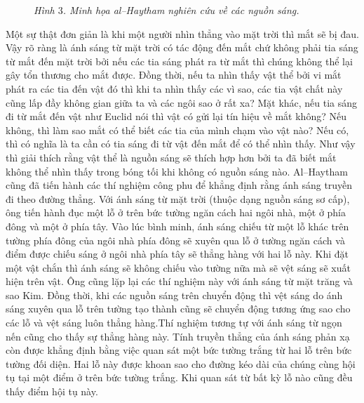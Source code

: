 \begin{multicols}{2}
\begin{figure}[H]
		\caption{\small\textit{\color{lichsutoanhoc}Hình $3$. Minh họa al--Haytham nghiên cứu về các nguồn sáng.}}
		\vspace*{-10pt}
	\end{figure}
	Một sự thật đơn giản là khi một người nhìn thẳng vào mặt trời thì mắt sẽ bị đau. Vậy rõ ràng là ánh sáng từ mặt trời có tác động đến mắt chứ không phải tia sáng từ mắt đến mặt trời bởi nếu các tia sáng phát ra từ mắt thì chúng không thể lại gây tổn thương cho mắt được. Đồng thời, nếu ta nhìn thấy vật thể bởi vi mắt phát ra các tia đến vật đó thì khi ta nhìn thấy các vì sao, các tia vật chất này cũng lấp đầy không gian giữa ta và các ngôi sao ở rất xa?
	\vskip 0.1cm
	Mặt khác, nếu tia sáng đi từ mắt đến vật như Euclid nói thì vật có gửi lại tín hiệu về mắt không? Nếu không, thì làm sao mắt có thể biết các tia của mình chạm vào vật nào? Nếu có, thì có nghĩa là ta cần có tia sáng đi từ vật đến mắt để có thể nhìn thấy. Như vậy thì giải thích rằng vật thể là nguồn sáng sẽ thích hợp hơn bởi ta đã biết mắt không thể nhìn thấy trong bóng tối khi không có nguồn sáng nào.
	\vskip 0.1cm
	Al--Haytham cũng đã tiến hành các thí nghiệm công phu để khẳng định rằng ánh sáng truyền đi theo đường thẳng. Với ánh sáng từ mặt trời (thuộc dạng nguồn sáng sơ cấp), ông tiến hành đục một lỗ ở trên bức tường ngăn cách hai ngôi nhà, một ở phía đông và một ở phía tây. Vào lúc bình minh, ánh sáng chiếu từ một lỗ khác trên tường phía đông của ngôi nhà phía đông sẽ xuyên qua lỗ ở tường ngăn cách và điểm được chiếu sáng ở ngôi nhà phía tây sẽ thẳng hàng với hai lỗ này. Khi đặt một vật chắn thì ánh sáng sẽ không chiếu vào tường nữa mà sẽ vệt sáng sẽ xuất hiện trên vật. Ông cũng lặp lại các thí nghiệm này với ánh sáng từ mặt trăng và sao Kim. Đồng thời, khi các nguồn sáng trên chuyển động thì vệt sáng do ánh sáng xuyên qua lỗ trên tường tạo thành cũng sẽ chuyển động tương ứng sao cho các lỗ và vệt sáng luôn thẳng hàng.Thí nghiệm tương tự với ánh sáng từ ngọn nến cũng cho thấy sự thẳng hàng này. Tính truyền thẳng của ánh sáng phản xạ còn được khẳng định bằng việc quan sát một bức tường trắng từ hai lỗ trên bức tường đối diện. Hai lỗ này được khoan sao cho đường kéo dài của chúng cùng hội tụ tại một điểm ở trên bức tường trắng. Khi quan sát từ bất kỳ lỗ nào cũng đều thấy điểm hội tụ này.
	\begin{figure}[H]
		\vspace*{-10pt}
		\centering
		\captionsetup{labelformat= empty, justification=centering}

\end{figure}
\end{multicols}
